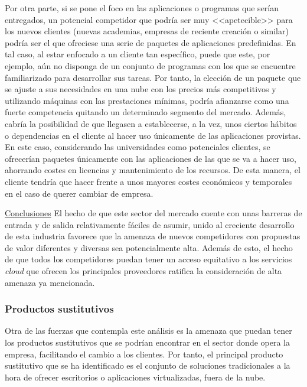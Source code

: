 Por otra parte, si se pone el foco en las aplicaciones o programas que serían entregados, un potencial competidor que podría ser muy <<apetecible>> para los nuevos clientes (nuevas academias, empresas de reciente creación o similar) podría ser el que ofreciese una serie de paquetes de aplicaciones predefinidas. En tal caso, al estar enfocado a un cliente tan específico, puede que este, por ejemplo, aún no disponga de un conjunto de programas con los que se encuentre familiarizado para desarrollar sus tareas. Por tanto, la elección de un paquete que se ajuste a sus necesidades en una nube con los precios más competitivos y utilizando máquinas con las prestaciones mínimas, podría afianzarse como una fuerte competencia quitando un determinado segmento del mercado. Además, cabría la posibilidad de que llegasen a establecerse, a la vez, unos ciertos hábitos o dependencias en el cliente al hacer uso únicamente de las aplicaciones provistas. En este caso, considerando las universidades como potenciales clientes, se ofrecerían paquetes únicamente con las aplicaciones de las que se va a hacer uso, ahorrando costes en licencias y mantenimiento de los recursos. De esta manera, el cliente tendría que hacer frente a unos mayores costes económicos y temporales en el caso de querer cambiar de empresa.

\noindent\underline{Conclusiones}\newline
\indent El hecho de que este sector del mercado cuente con unas barreras de entrada y de salida relativamente fáciles de asumir, unido al creciente desarrollo de esta industria favorece que la amenaza de nuevos competidores con propuestas de valor diferentes y diversas sea potencialmente alta. Además de esto, el hecho de que todos los competidores puedan tener un acceso equitativo a los servicios \textit{cloud} que ofrecen los principales proveedores ratifica la consideración de alta amenaza ya mencionada. 

\clearpage


\subsubsection{Productos sustitutivos}
Otra de las fuerzas que contempla este análisis es la amenaza que puedan tener los productos sustitutivos que se podrían encontrar en el sector donde opera la empresa, facilitando el cambio a los clientes. Por tanto, el principal producto sustitutivo que se ha identificado es el conjunto de soluciones tradicionales a la hora de ofrecer escritorios o aplicaciones virtualizadas, fuera de la nube.

